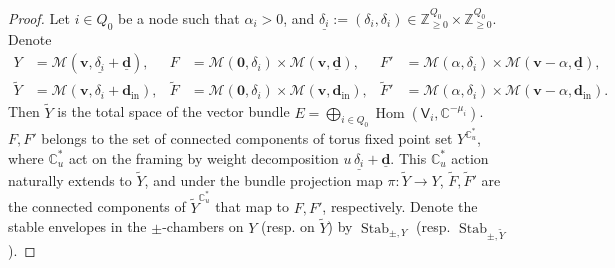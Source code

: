 \documentclass[10pt]{amsart}
\theoremstyle{definition}
\numberwithin{equation}{section}
\newcommand{\bC}{\mathbb{C}}
\newcommand{\bZ}{\mathbb{Z}}
\newcommand{\bv}{\mathbf{v}}
\newcommand{\bd}{\mathbf{d}}
\newcommand{\cM}{\mathcal{M}}
\newcommand{\Hom}{\operatorname{Hom}}
\newcommand{\Stab}{\operatorname{Stab}}
\newcommand{\In}{\operatorname{in}}
\begin{document}
\begin{proof}
Let $i\in Q_0$ be a node such that $\alpha_i>0$, and $\underline{\delta_i}:=(\delta_i,\delta_i)\in \bZ_{\geqslant 0}^{Q_0}\times \bZ_{\geqslant 0}^{Q_0}$. 
Denote
\begin{align*}
Y&=\cM(\bv,\underline{\delta_i}+\underline{\bd}), & F&=\cM(\mathbf 0,\delta_i)\times \cM(\bv,\underline{\bd}),& F'&=\cM(\alpha,\delta_i)\times \cM(\bv-\alpha,\underline{\bd}),\\
\widetilde{Y}&=\cM(\bv,\delta_i+\bd_{\In}),& \widetilde{F}&=\cM(\mathbf 0,\delta_i)\times \cM(\bv,\bd_{\In}),& \widetilde{F}'&=\cM(\alpha,\delta_i)\times \cM(\bv-\alpha,\bd_{\In}).
\end{align*}
Then $\widetilde{Y}$ is the total space of the vector bundle $E=\bigoplus_{i\in Q_0}\Hom(\mathsf V_i, \bC^{-\mu_i})$. $F,F'$ belongs to the set of connected components of torus fixed point set $Y^{\bC^*_u}$, where $\bC^*_u$ act on the framing by weight decomposition $u\,\underline{\delta_i}+\underline{\bd}$. This $\bC^*_u$ action naturally extends to $\widetilde{Y}$, and under the bundle projection map $\pi\colon \widetilde{Y}\to Y$, $\widetilde{F}, \widetilde{F}'$ are the connected components of $\widetilde{Y}^{\bC^*_u}$ that map to $F,F'$, respectively. Denote the stable envelopes in the $\pm$-chambers on $Y$ (resp. on $\widetilde{Y}$) by $\Stab_{\pm,Y}$ (resp. $\Stab_{\pm,\widetilde{Y}}$).


\end{proof}
\end{document}
